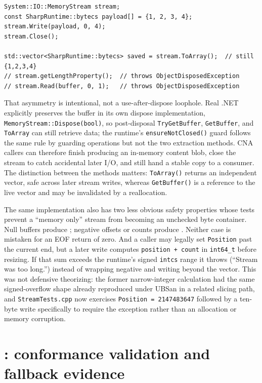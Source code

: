 \begin{lstlisting}
System::IO::MemoryStream stream;
const SharpRuntime::bytecs payload[] = {1, 2, 3, 4};
stream.Write(payload, 0, 4);
stream.Close();

std::vector<SharpRuntime::bytecs> saved = stream.ToArray();  // still {1,2,3,4}
// stream.getLengthProperty();  // throws ObjectDisposedException
// stream.Read(buffer, 0, 1);   // throws ObjectDisposedException
\end{lstlisting}

That asymmetry is intentional, not a use-after-dispose loophole. Real .NET explicitly preserves
the buffer in its own dispose implementation, \texttt{MemoryStream::Dispose(bool)}, so
post-disposal \texttt{TryGetBuffer}, \texttt{GetBuffer}, and \texttt{ToArray} can still retrieve data; the
runtime's \texttt{ensureNotClosed()} guard follows the same rule by guarding operations but not
the two extraction methods.  CNA callers can therefore finish producing an in-memory content
blob, close the stream to catch accidental later I/O, and still hand a stable copy to a consumer.
The distinction between the methods matters: \texttt{ToArray()} returns an independent vector,
safe across later stream writes, whereas \texttt{GetBuffer()} is a reference to the live vector
and may be invalidated by a reallocation.

The same implementation also has two less obvious safety properties whose tests prevent a
``memory only'' stream from becoming an unchecked byte container. Null buffers produce
; negative offsets or counts produce
. Neither case is mistaken for an EOF return of zero.
And a caller may legally set \texttt{Position} past the current end, but a later write computes
\texttt{position + count} in \texttt{int64\_t} before resizing.  If that sum exceeds the
runtime's signed \texttt{intcs} range it throws  (``Stream was too
long.'') instead of wrapping negative and writing beyond the vector.  This was not defensive
theorizing: the former narrow-integer calculation had the same signed-overflow shape already
reproduced under UBSan in a related slicing path, and \texttt{StreamTests.cpp} now exercises
\texttt{Position = 2147483647} followed by a ten-byte write specifically to require the
exception rather than an allocation or memory corruption.

\section{: conformance validation and fallback evidence}

